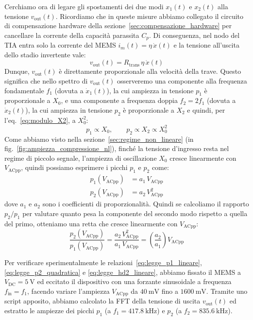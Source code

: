\documentclass[11pt,a4paper]{article}
\begin{document}
\vspace{0.3cm}
\noindent Cerchiamo ora di legare gli spostamenti dei due modi $x_1(t)$ e $x_2(t)$ alla tensione $v_{\text{out}}(t)$. Ricordiamo che in queste misure abbiamo collegato il circuito di compensazione hardware della sezione~\ref{sec:compensazione_hardware} per cancellare la corrente della capacità parassita $C_p$. Di conseguenza, nel nodo del TIA entra solo la corrente del MEMS $i_m(t) = \eta \, \dot{x}(t)$ e la tensione all'uscita dello stadio invertente vale:
\begin{equation}
    v_{\text{out}}(t) = R_{\text{trans}} \, \eta \, \dot{x}(t)
\end{equation}
Dunque, $v_{\text{out}}(t)$ è direttamente proporzionale alla velocità della trave. Questo significa che nello spettro di $v_{\text{out}}(t)$ osserveremo una componente alla frequenza fondamentale $f_1$ (dovuta a $\dot{x}_1(t)$), la cui ampiezza in tensione $p_1$ è proporzionale a $X_0$, e una componente a frequenza doppia $f_2 = 2 f_1$ (dovuta a $\dot{x}_2(t)$), la cui ampiezza in tensione $p_2$ è proporzionale a $X_2$ e quindi, per l'eq.~\eqref{eq:modulo_X2}, a $X_0^2$:
\begin{equation}
    p_1 \propto X_0, \qquad p_2 \propto X_2 \propto X_0^2
\end{equation}
Come abbiamo visto nella sezione~\ref{sec:regime_non_lineare} (in fig.~\ref{fig:ampiezza_compressione_nl}), finché la tensione d'ingresso resta nel regime di piccolo segnale, l'ampiezza di oscillazione $X_0$ cresce linearmente con $V_{\text{ACpp}}$, quindi possiamo esprimere i picchi $p_1$ e $p_2$ come:
\begin{align}
    \label{eq:legge_p1_lineare}
    p_1(V_{\text{ACpp}}) &= a_1 \, V_{\text{ACpp}} \\[4pt]
    \label{eq:legge_p2_quadratica}
    p_2(V_{\text{ACpp}}) &= a_2 \, V_{\text{ACpp}}^2
\end{align}
dove $a_1$ e $a_2$ sono i coefficienti di proporzionalità. Quindi se calcoliamo il rapporto $p_2 / p_1$ per valutare quanto pesa la componente del secondo modo rispetto a quella del primo, otteniamo una retta che cresce linearmente con $V_{\text{ACpp}}$:
\begin{equation}
    \label{eq:legge_hd2_lineare}
    \frac{p_2(V_{\text{ACpp}})}{p_1(V_{\text{ACpp}})} = \frac{a_2 \, V_{\text{ACpp}}^2}{a_1 \, V_{\text{ACpp}}} = \left(\frac{a_2}{a_1}\right) V_{\text{ACpp}}
\end{equation}

\noindent Per verificare sperimentalmente le relazioni~\eqref{eq:legge_p1_lineare}, \eqref{eq:legge_p2_quadratica} e \eqref{eq:legge_hd2_lineare}, abbiamo fissato il MEMS a $V_{\text{DC}} = \SI{5}{\volt}$ ed eccitato il dispositivo con una forzante sinusoidale a frequenza $f_{\text{in}} = f_1$, facendo variare l'ampiezza $V_{\text{ACpp}}$ da $\SI{40}{\milli\volt}$ fino a $\SI{1600}{\milli\volt}$. Tramite uno script apposito, abbiamo calcolato la FFT della tensione di uscita $v_{\text{out}}(t)$ ed estratto le ampiezze dei picchi $p_1$ (a $f_1 = \SI{417.8}{\kilo\hertz}$) e $p_2$ (a $f_2 = \SI{835.6}{\kilo\hertz}$).
\end{document}
